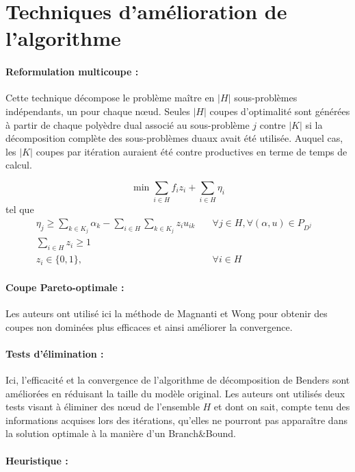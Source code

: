 \section{Techniques d’amélioration de l'algorithme}


\paragraph{Reformulation multicoupe : }
Cette technique décompose le problème maître en $|H|$ sous-problèmes indépendants, un pour chaque n\oe ud. Seules $|H|$ coupes d'optimalité sont générées à partir de chaque polyèdre dual associé au sous-problème $j$ contre $|K|$ si la décomposition complète des sous-problèmes duaux avait été utilisée. Auquel cas, les $|K|$ coupes par itération auraient été contre productives en terme de temps de calcul.


\[ \min \sum_{i \in H} f_iz_i + \sum_{i \in H} \eta_i  \]
tel que
\begin{subequations}
	\begin{align}
	\eta_j \ge \sum_{k \in K_j}\alpha_k - \sum_{i \in H}\sum_{k \in K_j} z_iu_{ik} \quad &\forall j \in H, \forall{(\alpha,u) \in P_{D^j}}&\\
	\sum_{i \in H} z_i \ge 1 \quad &&\\
	z_i \in \{0,1\}, \quad & \forall{i \in H}&
	\end{align}
\end{subequations}

\paragraph{Coupe Pareto-optimale : }
Les auteurs ont utilisé ici la méthode de Magnanti et Wong \cite[1981]{mw} pour obtenir des coupes non dominées plus efficaces et ainsi améliorer la convergence.

\paragraph{Tests d'élimination : }
Ici, l'efficacité et la convergence de l'algorithme de décomposition de Benders sont améliorées en réduisant la taille du modèle original. Les auteurs ont utilisés deux tests
visant à éliminer des n\oe ud de l'ensemble $H$ et dont on sait, compte tenu des informations acquises lors des itérations, qu'elles ne pourront pas apparaître dans la solution optimale à la manière d'un Branch\&Bound.


\paragraph{Heuristique : }